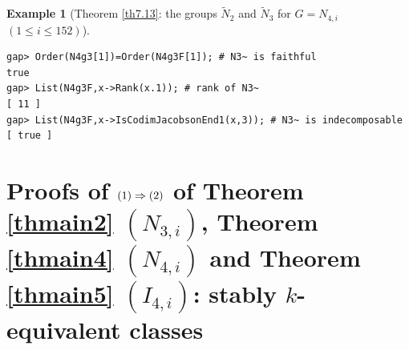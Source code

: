 \documentclass{amsart}
\theoremstyle{plain}
\theoremstyle{definition}
\newtheorem{example}[theorem]{Example}
\theoremstyle{remark}
\newcounter{sub}\def\tr{\mbox{tr }}
\begin{document}
\begin{example}[Theorem \ref{th7.13}: the groups $\widetilde{N}_2$ and $\widetilde{N}_3$ for $G=N_{4,i}$ $(1\leq i\leq 152)$]
\begin{verbatim}
gap> Order(N4g3[1])=Order(N4g3F[1]); # N3~ is faithful
true
gap> List(N4g3F,x->Rank(x.1)); # rank of N3~
[ 11 ]
gap> List(N4g3F,x->IsCodimJacobsonEnd1(x,3)); # N3~ is indecomposable
[ true ]
\end{verbatim}
\end{example}


\section{Proofs of ${\rm (1)}\Rightarrow {\rm (2)}$ of {Theorem \ref{thmain2}} $(N_{3,i})$, {Theorem \ref{thmain4}} $(N_{4,i})$ and {Theorem \ref{thmain5}} $(I_{4,i})$: stably $k$-equivalent classes}\label{S8}

\end{document}
